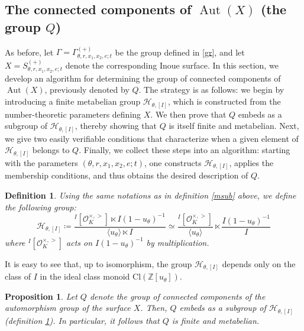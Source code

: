 \documentclass[12pt]{amsart}
\newtheorem{definition}{Definition}[section]
\newtheorem{proposition}{Proposition}[section]
\newcommand{\Z}{\mathbb{Z}}
\newcommand{\OO}{\mathcal{O}}
\DeclareMathOperator{\Aut}{Aut}
\begin{document}
\subsection{The connected components of $\Aut(X)$ (the group $Q$)}\label{gpq}
As before, let $\Gamma = \Gamma^{(+)}_{\theta,r,x_1,x_2,e;t}$
be the group defined in \ref{gr}, and let $X = S^{(+)}_{\theta,r,x_1,x_2,e;t}$ denote the corresponding Inoue surface. In this section, we develop an algorithm for determining the group of connected components of $\Aut(X)$, previously denoted by $Q$. The strategy is as follows: we begin by introducing a finite metabelian group $\mathcal{H}_{\theta,[I]}$, which is constructed from the number-theoretic parameters defining $X$. We then prove that $Q$ embeds as a subgroup of $\mathcal{H}_{\theta,[I]}$, thereby showing that $Q$ is itself finite and metabelian. Next, we give two easily verifiable conditions that characterize when a given element of $\mathcal{H}_{\theta,[I]}$ belongs to $Q$. Finally, we collect these steps into an algorithm: starting with the parameters $(\theta,r,x_1,x_2,e;t)$, one constructs $\mathcal{H}_{\theta,[I]}$, applies the membership conditions, and thus obtains the desired description of $Q$.


\begin{definition}\label{NTgroup}
Using the same notations as in definition \ref{msub} above, we define the following group:
$$\mathcal{H}_{\theta, [I]}\coloneq \frac{{}^I[\OO_K^{\times,>}]\ltimes I (1-u_\theta)^{-1}}{\langle u_\theta \rangle \ltimes I} \simeq\frac{{}^I[\OO_K^{\times,>}]}{\langle u_\theta \rangle} \ltimes \frac{I(1-u_\theta)^{-1}}{I}$$
where ${}^I[\OO_K^{\times,>}]$ acts on $I (1-u_\theta)^{-1}$ by multiplication.
\end{definition}

\noindent
It is easy to see that, up to isomorphism, the group $\mathcal{H}_{\theta, [I]}$ depends only on the class of $I$ in the ideal class monoid $\text{Cl}(\Z[u_\theta])$. 

\begin{proposition} \label{bound} Let $Q$ denote the group of connected components of the automorphism group of the surface $X$. Then, $Q$ embeds as a subgroup of $\mathcal{H}_{\theta, [I]}$ (definition \ref{NTgroup}). In particular, it follows that $Q$ is finite and metabelian.
\end{proposition}
\end{document}
